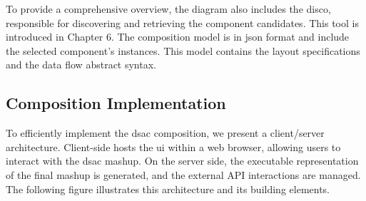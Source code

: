 To provide a comprehensive overview, the diagram also includes the \gls{disco}, responsible for discovering and retrieving the component candidates. This tool is introduced in Chapter 6. The composition model is in \gls{json} format and include the selected component’s instances. This model contains the layout specifications and the data flow abstract syntax.

\vspace{-10pt}
\hypertarget{sec:composition-imp}{%
\subsection{Composition Implementation}\label{sec:composition-imp}}
\vspace{10pt}

To efficiently implement the \gls{dsac} composition, we present a client/server architecture. Client-side hosts the \gls{ui} within a web browser, allowing users to interact with the \gls{dsac} mashup. On the server side, the executable representation of the final mashup is generated, and the external API interactions are managed. The following figure illustrates this architecture and its building elements.

